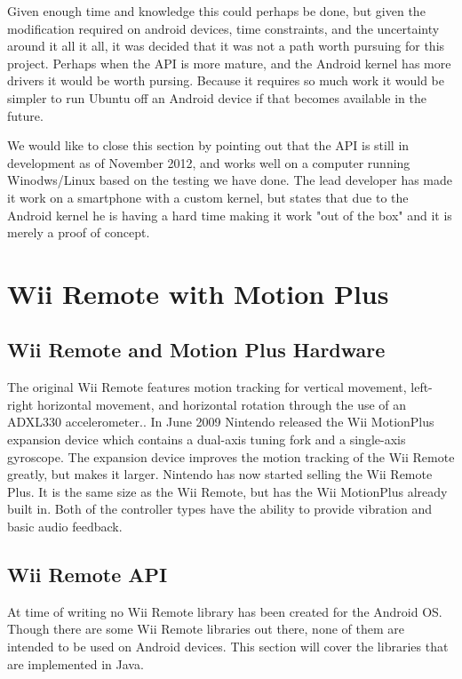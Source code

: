Given enough time and knowledge this could perhaps be done, but given the modification required on android devices, time constraints, and the uncertainty around it all it all, it was decided that it was not a path worth pursuing for this project. Perhaps when the API is more mature, and the Android kernel has more drivers it would be worth pursing. Because it requires so much work it would be simpler to run Ubuntu off an Android device if that becomes available in the future. \cite{ubuntuAndroid}

We would like to close this section by pointing out that the API is still in development as of November 2012, and works well on a computer running Winodws/Linux based on the testing we have done. The lead developer has made it work on a smartphone with a custom kernel, but states that due to the Android kernel he is having a hard time making it work "out of the box" and it is merely a proof of concept.

\section{Wii Remote with Motion Plus}

\subsection{Wii Remote and Motion Plus Hardware}
The original Wii Remote features motion tracking for vertical movement, left-right horizontal movement, and horizontal rotation through the use of an ADXL330 accelerometer.\cite{wiiAccelerometer}.
In June 2009 Nintendo released the Wii MotionPlus expansion device which contains a dual-axis tuning fork and a single-axis gyroscope\cite{wiiMotionPlus}.
The expansion device improves the motion tracking of the Wii Remote greatly, but makes it larger. Nintendo has now started selling the Wii Remote Plus. It is the same size as the Wii Remote, but has the Wii MotionPlus already built in. Both of the controller types have the ability to provide vibration and basic audio feedback.

\subsection{Wii Remote API}
At time of writing no Wii Remote library has been created for the Android OS. Though there are some Wii Remote libraries out there, none of them are intended to be used on Android devices. This section will cover the libraries that are implemented in Java.

